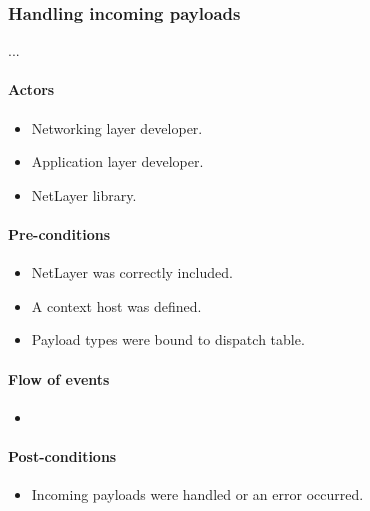 \documentclass[12pt]{report}
\begin{document}
                \subsubsection{Handling incoming payloads}
                    ...
                    \paragraph{Actors}
                        \begin{itemize}
                            \item Networking layer developer.
                            \item Application layer developer.
                            \item NetLayer library.
                        \end{itemize}

                    \paragraph{Pre-conditions}
                        \begin{itemize}
                            \item NetLayer was correctly included.
                            \item A context host was defined.
                            \item Payload types were bound to dispatch table.
                        \end{itemize}

                    \paragraph{Flow of events}
                        \begin{itemize}
                            \item
                        \end{itemize}

                    \paragraph{Post-conditions}
                        \begin{itemize}
                            \item Incoming payloads were handled or an error occurred.
                        \end{itemize}
\end{document}
